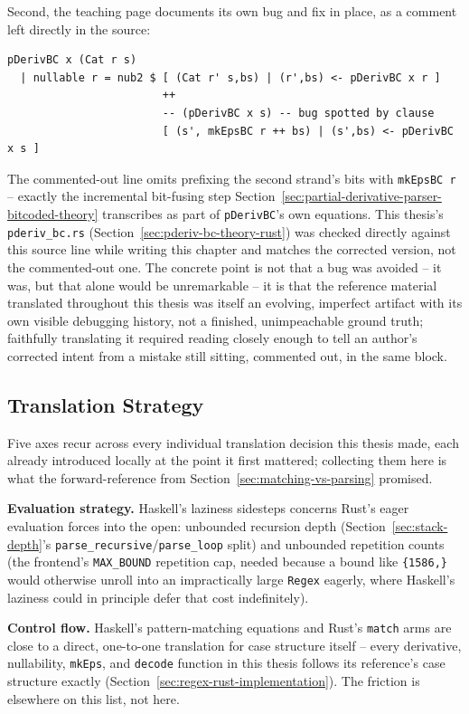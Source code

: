 Second, the teaching page documents its own bug and fix in place, as a
comment left directly in the source:
\begin{verbatim}
pDerivBC x (Cat r s)
  | nullable r = nub2 $ [ (Cat r' s,bs) | (r',bs) <- pDerivBC x r ]
                        ++
                        -- (pDerivBC x s) -- bug spotted by clause
                        [ (s', mkEpsBC r ++ bs) | (s',bs) <- pDerivBC x s ]
\end{verbatim}
The commented-out line omits prefixing the second strand's bits with
\texttt{mkEpsBC r} -- exactly the incremental bit-fusing step
Section~\ref{sec:partial-derivative-parser-bitcoded-theory} transcribes
as part of \texttt{pDerivBC}'s own equations. This thesis's
\texttt{pderiv\_bc.rs} (Section~\ref{sec:pderiv-bc-theory-rust}) was
checked directly against this source line while writing this chapter and
matches the corrected version, not the commented-out one. The concrete
point is not that a bug was avoided -- it was, but that alone would be
unremarkable -- it is that the reference material translated throughout
this thesis was itself an evolving, imperfect artifact with its own
visible debugging history, not a finished, unimpeachable ground truth;
faithfully translating it required reading closely enough to tell an
author's corrected intent from a mistake still sitting, commented out, in
the same block.

\subsection{Translation Strategy}
\label{sec:translation-strategy}

Five axes recur across every individual translation decision this thesis
made, each already introduced locally at the point it first mattered;
collecting them here is what the forward-reference from
Section~\ref{sec:matching-vs-parsing} promised.

\textbf{Evaluation strategy.} Haskell's laziness sidesteps concerns Rust's
eager evaluation forces into the open: unbounded recursion depth
(Section~\ref{sec:stack-depth}'s \texttt{parse\_recursive}/\texttt{parse\_loop}
split) and unbounded repetition counts (the frontend's \texttt{MAX\_BOUND}
repetition cap, needed because a bound like \texttt{\{1586,\}} would
otherwise unroll into an impractically large \texttt{Regex} eagerly,
where Haskell's laziness could in principle defer that cost
indefinitely).

\textbf{Control flow.} Haskell's pattern-matching equations and Rust's
\texttt{match} arms are close to a direct, one-to-one translation for
case structure itself -- every derivative, nullability, \texttt{mkEps},
and \texttt{decode} function in this thesis follows its reference's case
structure exactly (Section~\ref{sec:regex-rust-implementation}). The
friction is elsewhere on this list, not here.

